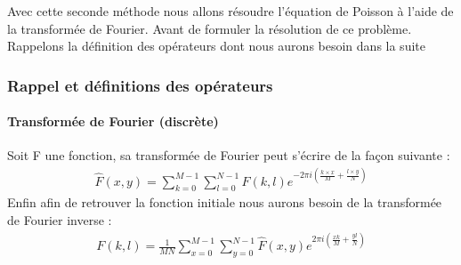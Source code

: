 Avec cette seconde méthode nous allons résoudre l'équation de Poisson à l'aide de la transformée de Fourier. Avant de formuler la résolution de ce problème. Rappelons la définition des opérateurs dont nous aurons besoin dans la suite
\subsubsection{Rappel et définitions des opérateurs}
\paragraph{Transformée de Fourier (discrète)}
Soit F une fonction, sa transformée de Fourier peut s'écrire de la façon suivante : 
\begin{equation}
\begin{aligned}
\widehat{F}(x,y) = \sum_{k = 0}^{M-1} \sum_{l = 0}^{N-1} F(k,l) e^{-2\pi i\left(\frac{k\times x}{M}+\frac{l\times y}{N}\right)}
\end{aligned}
\end{equation}
Enfin afin de retrouver la fonction initiale nous aurons besoin de la transformée de Fourier inverse : 
\begin{equation}
\begin{aligned}
F(k,l) = \frac{1}{MN} \sum_{x = 0}^{M-1} \sum_{y = 0}^{N-1} \hat{F}(x,y) e^{2\pi i \left(\frac{xk}{M}+\frac{yl}{N}\right)}
\end{aligned}
\end{equation}
